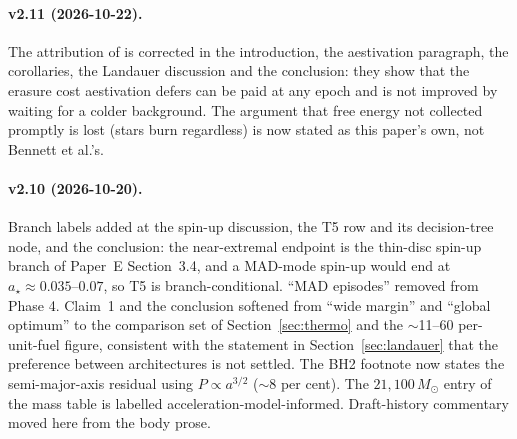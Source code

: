 \documentclass[11pt]{article}
\newcommand{\msun}{\ensuremath{M_\odot}}
\newcommand{\astar}{\ensuremath{a_\star}}
\begin{document}
\paragraph{v2.11 (2026-10-22).} The attribution of \citet{Bennett2019} is corrected in the introduction, the aestivation paragraph, the corollaries, the Landauer discussion and the conclusion: they show that the erasure cost aestivation defers can be paid at any epoch and is not improved by waiting for a colder background. The argument that free energy not collected promptly is lost (stars burn regardless) is now stated as this paper's own, not Bennett et al.'s.

\paragraph{v2.10 (2026-10-20).} Branch labels added at the spin-up discussion, the T5 row and its decision-tree node, and the conclusion: the near-extremal endpoint is the thin-disc spin-up branch of Paper~E Section~3.4, and a MAD-mode spin-up would end at $\astar \approx 0.035$--$0.07$, so T5 is branch-conditional. ``MAD episodes'' removed from Phase 4. Claim~1 and the conclusion softened from ``wide margin'' and ``global optimum'' to the comparison set of Section~\ref{sec:thermo} and the $\sim$11--60 per-unit-fuel figure, consistent with the statement in Section~\ref{sec:landauer} that the preference between architectures is not settled. The BH2 footnote now states the semi-major-axis residual using $P \propto a^{3/2}$ ($\sim$8 per cent). The $21{,}100\,\msun$ entry of the mass table is labelled acceleration-model-informed. Draft-history commentary moved here from the body prose.
\end{document}

